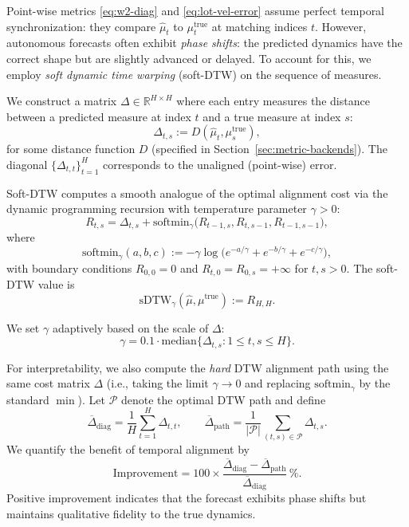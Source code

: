 \documentclass[11pt]{article}
\newcommand{\1}{\mathbf{1}}
\begin{document}
Point-wise metrics \eqref{eq:w2-diag} and \eqref{eq:lot-vel-error} assume perfect temporal synchronization: they compare $\widehat{\mu}_t$ to $\mu_t^{\text{true}}$ at matching indices $t$. However, autonomous forecasts often exhibit \emph{phase shifts}: the predicted dynamics have the correct shape but are slightly advanced or delayed. To account for this, we employ \emph{soft dynamic time warping} (soft-DTW) \cite{cuturi2017soft} on the sequence of measures.

We construct a matrix $\Delta \in \mathbb{R}^{H \times H}$ where each entry measures the distance between a predicted measure at index $t$ and a true measure at index $s$:
\begin{equation}\label{eq:delta-matrix}
\Delta_{t,s} := D(\widehat{\mu}_t, \mu_s^{\text{true}}),
\end{equation}
for some distance function $D$ (specified in Section~\ref{sec:metric-backends}). The diagonal $\{\Delta_{t,t}\}_{t=1}^H$ corresponds to the unaligned (point-wise) error.

Soft-DTW computes a smooth analogue of the optimal alignment cost via the dynamic programming recursion with temperature parameter $\gamma > 0$:
\begin{equation}\label{eq:softdtw-recursion}
R_{t,s} = \Delta_{t,s} + \mathrm{softmin}_\gamma\bigl(R_{t-1,s}, R_{t,s-1}, R_{t-1,s-1}\bigr),
\end{equation}
where
\begin{equation}
\mathrm{softmin}_\gamma(a, b, c) := -\gamma \log\bigl(e^{-a/\gamma} + e^{-b/\gamma} + e^{-c/\gamma}\bigr),
\end{equation}
with boundary conditions $R_{0,0} = 0$ and $R_{t,0} = R_{0,s} = +\infty$ for $t, s > 0$. The soft-DTW value is
\[
\mathrm{sDTW}_\gamma(\widehat{\mu}, \mu^{\text{true}}) := R_{H,H}.
\]

We set $\gamma$ adaptively based on the scale of $\Delta$:
\begin{equation}\label{eq:gamma-heuristic}
\gamma = 0.1 \cdot \mathrm{median}\{\Delta_{t,s} : 1 \le t,s \le H\}.
\end{equation}

For interpretability, we also compute the \emph{hard} DTW alignment path using the same cost matrix $\Delta$ (i.e., taking the limit $\gamma \to 0$ and replacing $\mathrm{softmin}_\gamma$ by the standard $\min$). Let $\mathcal{P}$ denote the optimal DTW path and define
\begin{equation}\label{eq:align-improve}
\overline{\Delta}_{\mathrm{diag}} = \frac{1}{H}\sum_{t=1}^H \Delta_{t,t}, 
\qquad
\overline{\Delta}_{\mathrm{path}} = \frac{1}{|\mathcal{P}|}\sum_{(t,s)\in\mathcal{P}} \Delta_{t,s}.
\end{equation}
We quantify the benefit of temporal alignment by
\begin{equation}
\mathrm{Improvement} = 100 \times \frac{\overline{\Delta}_{\mathrm{diag}} - \overline{\Delta}_{\mathrm{path}}}{\overline{\Delta}_{\mathrm{diag}}}\,\%.
\end{equation}
Positive improvement indicates that the forecast exhibits phase shifts but maintains qualitative fidelity to the true dynamics.
\end{document}
